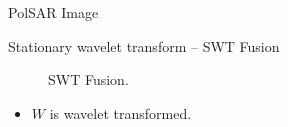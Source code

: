 \documentclass[10pt]{beamer}
\begin{document}
\begin{frame}[fragile]{PolSAR Image}
\begin{alertblock}{Stationary wavelet transform -- SWT Fusion}
\begin{figure}[htb!]
\begin{tikzpicture}
\end{tikzpicture}
	\caption{SWT Fusion.}
\label{cap_fusao_fig01}
\end{figure}
\begin{itemize}
\vspace{-0.8cm}
\item $W$ is wavelet transformed.
\end{itemize}
\end{alertblock}
\end{frame}




\end{document}

